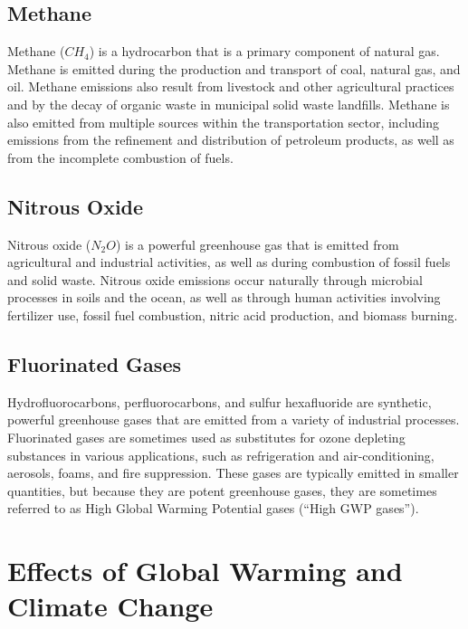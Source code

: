 \documentclass{article}
\begin{document}
\subsection{Methane}
Methane ($CH_4$) is a hydrocarbon that is a primary component of natural gas.
Methane is emitted during the production and transport of coal, natural gas,
and oil. Methane emissions also result from livestock and other agricultural
practices and by the decay of organic waste in municipal solid waste landfills.
Methane is also emitted from multiple sources within the transportation sector,
including emissions from the refinement and distribution of petroleum products,
as well as from the incomplete combustion of fuels.

\subsection{Nitrous Oxide}
Nitrous oxide ($N_2O$) is a powerful greenhouse gas that is emitted from
agricultural and industrial activities, as well as during combustion of fossil
fuels and solid waste. Nitrous oxide emissions occur naturally through
microbial processes in soils and the ocean, as well as through human activities
involving fertilizer use, fossil fuel combustion, nitric acid production, and
biomass burning.

\subsection{Fluorinated Gases}
Hydrofluorocarbons, perfluorocarbons, and sulfur hexafluoride are synthetic,
powerful greenhouse gases that are emitted from a variety of industrial
processes. Fluorinated gases are sometimes used as substitutes for ozone
depleting substances in various applications, such as refrigeration and
air-conditioning, aerosols, foams, and fire suppression. These gases are
typically emitted in smaller quantities, but because they are potent greenhouse
gases, they are sometimes referred to as High Global Warming Potential gases
(``High GWP gases'').

\section{Effects of Global Warming and Climate Change}
\end{document}
